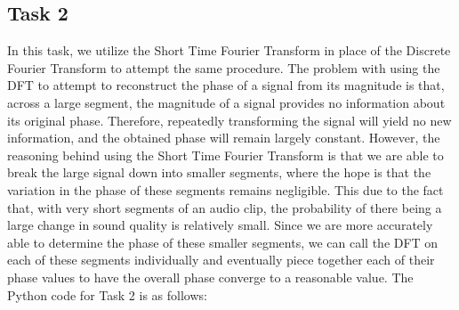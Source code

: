 \documentclass[letterpaper,twocolumn,10pt]{article}
\begin{document}
\subsection*{Task 2}
In this task, we utilize the Short Time Fourier Transform in place of the Discrete Fourier Transform to attempt the same procedure. The problem with using the DFT to attempt to reconstruct the phase of a signal from its magnitude is that, across a large segment, the magnitude of a signal provides no information about its original phase. Therefore, repeatedly transforming the signal will yield no new information, and the obtained phase will remain largely constant. \hspace*{\fill}
\vspace{3mm}
\linebreak
However, the reasoning behind using the Short Time Fourier Transform is that we are able to break the large signal down into smaller segments, where the hope is that the variation in the phase of these segments remains negligible. This due to the fact that, with very short segments of an audio clip, the probability of there being a large change in sound quality is relatively small. Since we are more accurately able to determine the phase of these smaller segments, we can call the DFT on each of these segments individually and eventually piece together each of their phase values to have the overall phase converge to a reasonable value.\hspace*{\fill}
\vspace{3mm}
\linebreak
The Python code for Task 2 is as follows:
\end{document}
